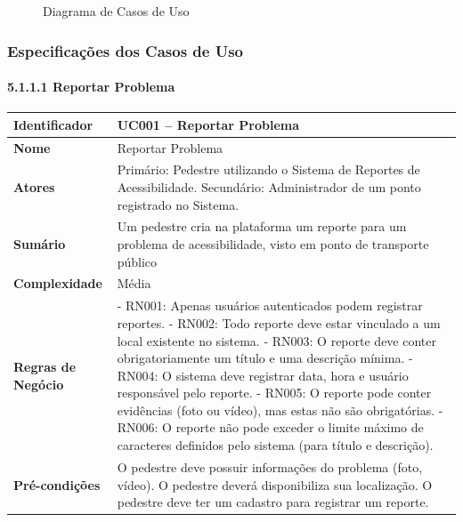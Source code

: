 \documentclass[12pt,a4paper]{article}
\begin{document}
\begin{figure}[H]
\centering

\caption{Diagrama de Casos de Uso}
\end{figure}

\subsubsection{Especificações dos Casos de Uso}

\paragraph{5.1.1.1 Reportar Problema}

\begin{longtable}{|>{\raggedright\arraybackslash}p{3.5cm}|>{\raggedright\arraybackslash}p{10cm}|}
\hline
\textbf{Identificador} & UC001 – Reportar Problema \\
\hline
\textbf{Nome} & Reportar Problema \\
\hline
\textbf{Atores} & Primário: Pedestre utilizando o Sistema de Reportes de Acessibilidade. \newline Secundário: Administrador de um ponto registrado no Sistema. \\
\hline
\textbf{Sumário} & Um pedestre cria na plataforma um reporte para um problema de acessibilidade, visto em ponto de transporte público \\
\hline
\textbf{Complexidade} & Média \\
\hline
\textbf{Regras de Negócio} & - RN001: Apenas usuários autenticados podem registrar reportes. \newline - RN002: Todo reporte deve estar vinculado a um local existente no sistema. \newline - RN003: O reporte deve conter obrigatoriamente um título e uma descrição mínima. \newline - RN004: O sistema deve registrar data, hora e usuário responsável pelo reporte. \newline - RN005: O reporte pode conter evidências (foto ou vídeo), mas estas não são obrigatórias. \newline - RN006: O reporte não pode exceder o limite máximo de caracteres definidos pelo sistema (para título e descrição). \\
\hline
\textbf{Pré-condições} & O pedestre deve possuir informações do problema (foto, vídeo). \newline O pedestre deverá disponibiliza sua localização. \newline O pedestre deve ter um cadastro para registrar um reporte. \\

\end{longtable}
\end{document}
